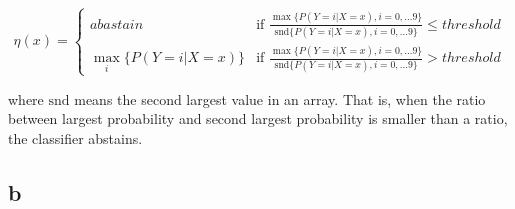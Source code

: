 \documentclass[a4paper,11pt]{article}
\theoremstyle{mytheor}
\begin{document}
\begin{equation}
\eta(x) = \left\{ \begin{array}{ll}
abastain & \mbox{if $\frac{\max \{P(Y=i | X = x ), i = 0,...9 \} }{\text{snd} \{P(Y=i | X = x ), i = 0,...9 \}}  $} \leq threshold \\
\max_i \{P(Y=i | X = x )\} & \mbox{if $\frac{\max \{P(Y=i | X = x ), i = 0,...9 \} }{\text{snd} \{P(Y=i | X = x ), i = 0,...9 \}} $} > threshold \end{array} 
\right.
\end{equation}

where $\text{snd}$ means the second largest value in an array. That is, when the ratio between largest probability and second largest probability is smaller than a ratio, the classifier abstains.


\subsection*{b}
\end{document}
